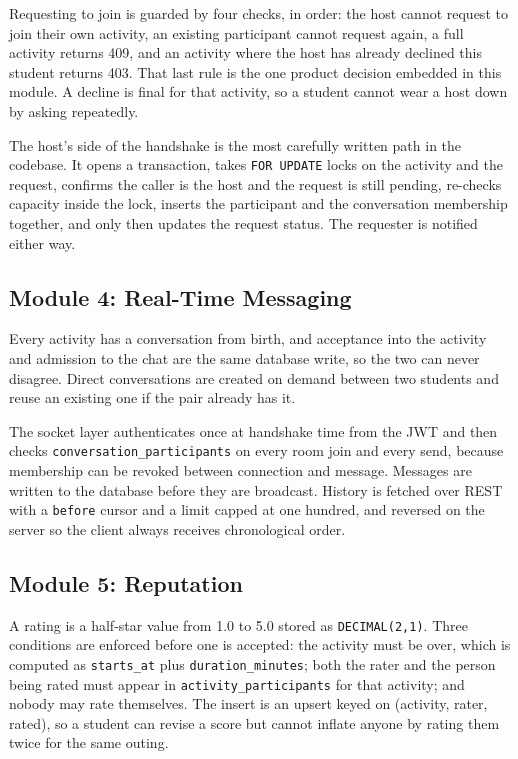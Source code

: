 \documentclass{tietreport}
\begin{document}
Requesting to join is guarded by four checks, in order: the host cannot request to join
their own activity, an existing participant cannot request again, a full activity
returns 409, and an activity where the host has already declined this student returns
403. That last rule is the one product decision embedded in this module. A decline is
final for that activity, so a student cannot wear a host down by asking repeatedly.

The host's side of the handshake is the most carefully written path in the codebase. It
opens a transaction, takes \texttt{FOR UPDATE} locks on the activity and the request,
confirms the caller is the host and the request is still pending, re-checks capacity
inside the lock, inserts the participant and the conversation membership together, and
only then updates the request status. The requester is notified either way.

\subsection{Module 4: Real-Time Messaging}

Every activity has a conversation from birth, and acceptance into the activity and
admission to the chat are the same database write, so the two can never disagree.
Direct conversations are created on demand between two students and reuse an existing
one if the pair already has it.

The socket layer authenticates once at handshake time from the JWT and then checks
\texttt{conversation\_\allowbreak participants} on every room join and every send, because
membership can be revoked between connection and message. Messages are written to the
database before they are broadcast. History is fetched over REST with a
\texttt{before} cursor and a limit capped at one hundred, and reversed on the server so
the client always receives chronological order.

\subsection{Module 5: Reputation}

A rating is a half-star value from 1.0 to 5.0 stored as \texttt{DECIMAL(2,1)}. Three
conditions are enforced before one is accepted: the activity must be over, which is
computed as \texttt{starts\_at} plus \texttt{duration\_minutes}; both the rater and the
person being rated must appear in \texttt{activity\_participants} for that activity; and
nobody may rate themselves. The insert is an upsert keyed on (activity, rater, rated),
so a student can revise a score but cannot inflate anyone by rating them twice for the
same outing.
\end{document}
